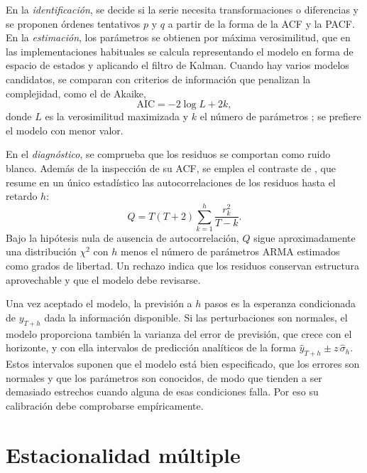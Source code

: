 En la \emph{identificación}, se decide si la serie necesita transformaciones
o diferencias y se proponen órdenes tentativos $p$ y $q$ a partir de la
forma de la ACF y la PACF. En la \emph{estimación}, los parámetros se
obtienen por máxima verosimilitud, que en las implementaciones habituales se
calcula representando el modelo en forma de espacio de estados y aplicando
el filtro de Kalman. Cuando hay varios modelos candidatos, se comparan con
criterios de información que penalizan la complejidad, como el de Akaike,
\begin{equation}
	\mathrm{AIC} = -2 \log L + 2k,
\end{equation}
donde $L$ es la verosimilitud maximizada y $k$ el número de parámetros
\parencite{akaike1974new}; se prefiere el modelo con menor valor.

En el \emph{diagnóstico}, se comprueba que los residuos se comportan como
ruido blanco. Además de la inspección de su ACF, se emplea el contraste de
\textcite{ljung1978measure}, que resume en un único estadístico las
autocorrelaciones de los residuos hasta el retardo $h$:
\begin{equation}
	Q = T(T+2) \sum_{k=1}^{h} \frac{r_k^2}{T-k}.
\end{equation}
Bajo la hipótesis nula de ausencia de autocorrelación, $Q$ sigue
aproximadamente una distribución $\chi^2$ con $h$ menos el número de
parámetros ARMA estimados como grados de libertad. Un rechazo indica que los
residuos conservan estructura aprovechable y que el modelo debe revisarse.

Una vez aceptado el modelo, la previsión a $h$ pasos es la esperanza
condicionada de $y_{T+h}$ dada la información disponible. Si las
perturbaciones son normales, el modelo proporciona también la varianza del
error de previsión, que crece con el horizonte, y con ella intervalos de
predicción analíticos de la forma $\hat{y}_{T+h} \pm z\, \hat{\sigma}_h$.
Estos intervalos suponen que el modelo está bien especificado, que los
errores son normales y que los parámetros son conocidos, de modo que tienden
a ser demasiado estrechos cuando alguna de esas condiciones falla. Por eso su
calibración debe comprobarse empíricamente.

\section{Estacionalidad múltiple}\label{sec:estacionalidad-multiple}

